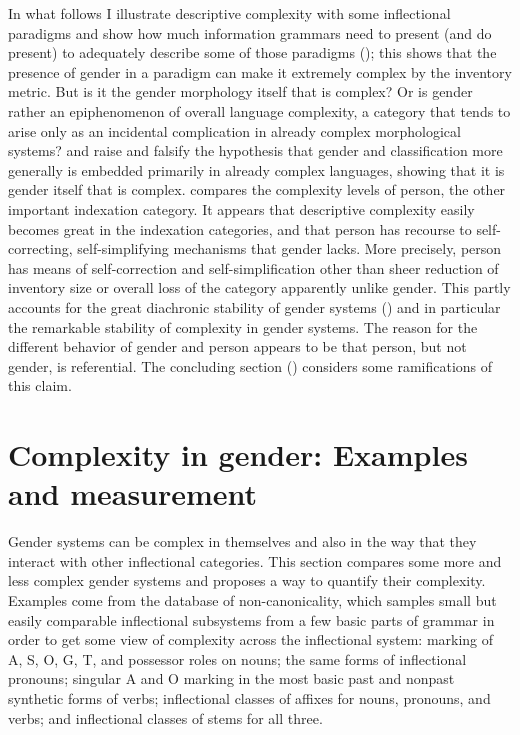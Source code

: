 \documentclass[output=collectionpaper]{langsci/langscibook}
\begin{document}
\largerpage[-1]
In what follows I illustrate descriptive complexity with some inflectional para\-digms and show how much information grammars need to present (and do pre\-sent) to adequately describe some of those paradigms (); this shows that the presence of gender in a paradigm can make it extremely complex by the inventory metric. But is it the gender morphology itself that is complex? Or is gender rather an epiphenomenon of overall language complexity, a category that tends to arise only as an incidental complication in already complex morphological systems?  and  raise and falsify the hypothesis that gender \textendash{} and classification more generally \textendash{} is embedded primarily in already complex languages, showing that it is gender itself that is complex.  compares the complexity levels of person, the other important indexation category. It appears that descriptive complexity easily becomes great in the indexation categories, and that person has recourse to self-correcting, self-simplifying mechanisms that gender lacks. More precisely, person has means of self-correction and self-simplification other than sheer reduction of inventory size or overall loss of the category \textendash{} apparently unlike gender. This partly accounts for the great diachronic stability of gender systems (\citealt{Matasovic2014}) and in particular the remarkable stability of complexity in gender systems. The reason for the different behavior of gender and person appears to be that person, but not gender, is referential. The concluding section () considers some ramifications of this claim.

\section{Complexity in gender: Examples and measurement}
\label{sec:Nich:2}

Gender systems can be complex in themselves and also in the way that they interact with other inflectional categories. This section compares some more and less complex gender systems and proposes a way to quantify their complexity. Examples come from the database of non-canonicality, which samples small but easily comparable inflectional subsystems from a few basic parts of grammar in order to get some view of complexity across the inflectional system: marking of A, S, O, G, T, and possessor roles on nouns; the same forms of inflectional pronouns; singular A and O marking in the most basic past and nonpast synthetic forms of verbs; inflectional classes of affixes for nouns, pronouns, and verbs; and inflectional classes of stems for all three.
\end{document}
